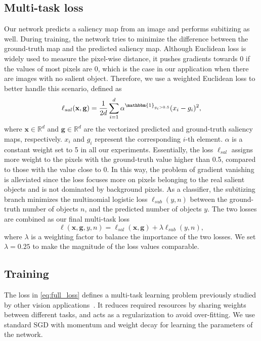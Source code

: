 \documentclass[10pt,twocolumn,letterpaper]{article}
\begin{document}
\subsection{Multi-task loss}
Our network predicts a saliency map from an image and performs subitizing as well. During training, the network tries to minimize the difference between the ground-truth map and the predicted saliency map. 
Although Euclidean loss is widely used to measure the pixel-wise distance, it pushes gradients towards 0 if the values of most pixels are 0, which is the case in our application when there are images with no salient object. Therefore, we use a weighted Euclidean loss to better handle this scenario, defined as
\begin{equation}
\ell_{sal} (\mathbf{x},\mathbf{g})= \frac{1}{2d} \sum_{i=1}^{d} \alpha^{\mathbbm{1}_{g_i>0.5}} (x_i-g_i)^2 ,
\label{eq:weighted_euc_loss}
\end{equation}
where $\mathbf{x} \in \mathbb{R}^d$ and $\mathbf{g} \in \mathbb{R}^d$ are the vectorized predicted and ground-truth saliency maps, respectively. $x_i$ and $g_i$ represent the corresponding $i$-th element.
$\alpha$ is a constant weight set to 5 in all our experiments.
Essentially, the loss $\ell_{sal}$ assigns more weight to the pixels with the ground-truth value higher than 0.5, compared to those with the value close to 0. 
In this way, the problem of gradient vanishing is alleviated since the loss focuses more on pixels belonging to the real salient objects and is not dominated by background pixels. As a classifier, the subitizing branch minimizes the multinomial logistic loss $\ell_{sub}(y,n)$ between the ground-truth number of objects $n$, and the predicted number of objects $y$.
The two losses are combined as our final multi-task loss
\begin{equation}
\ell(\mathbf{x},\mathbf{g},y,n) = \ell_{sal}(\mathbf{x},\mathbf{g}) + \lambda \ell_{sub}(y,n),
\label{eq:full_loss}
\end{equation}
where $\lambda$ is a weighting factor to balance the importance of the two losses. We set $\lambda=0.25$ to make the magnitude of the loss values comparable. 

\subsection{Training}
\label{sec:training}
The loss in \eqref{eq:full_loss} defines a multi-task learning problem previously studied by other vision applications~\cite{DBLP:conf/iccv/Girshick15,DBLP:conf/nips/RenHGS15}. It reduces required resources by sharing  weights between different tasks, and acts as a regularization to avoid over-fitting. We use standard SGD with momentum and weight decay for learning the parameters of the network. 
\end{document}
